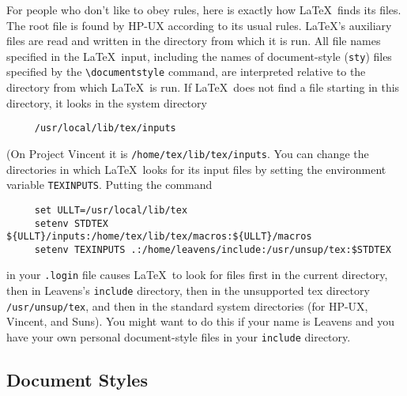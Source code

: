For people who don't like to obey rules, 
here is exactly how \LaTeX\ finds its
files.  The root file is found by HP-UX according to its usual rules.
\LaTeX's auxiliary files are read and written in the directory from
which it is run.  All file names specified in the \LaTeX\ input,
including the names of document-style ({\tt sty}) files specified by
the \hbox{\verb|\documentstyle|} command, are interpreted relative to
the directory from which \LaTeX\ is run.  If \LaTeX\ does not find a
file starting in this directory, it looks in the system directory
\begin{verbatim}
     /usr/local/lib/tex/inputs
\end{verbatim}
(On Project Vincent it is \hbox{\verb|/home/tex/lib/tex/inputs|}.
You can change the directories in
which \LaTeX\ looks for its input files by setting the environment
variable \mbox{\tt TEXINPUTS}.  Putting the command
\begin{verbatim}
     set ULLT=/usr/local/lib/tex
     setenv STDTEX ${ULLT}/inputs:/home/tex/lib/tex/macros:${ULLT}/macros
     setenv TEXINPUTS .:/home/leavens/include:/usr/unsup/tex:$STDTEX
\end{verbatim}
in your \mbox{\tt .login} file causes \LaTeX\ to look for files first
in the current directory, then in Leavens's {\tt include} directory,
then in the unsupported tex directory {\tt /usr/unsup/tex}, and
then in the standard system directories (for HP-UX, Vincent, and Suns).
You might want to do this if your name
is Leavens and you have your own personal document-style files in your
{\tt include} directory. 

\subsection{Document Styles}


